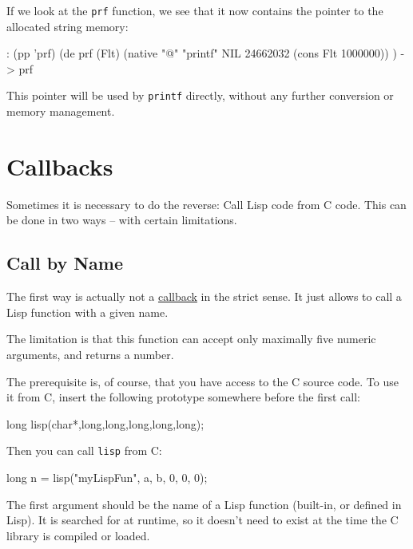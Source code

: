 If we look at the \texttt{prf} function, we see that it now contains the
pointer to the allocated string memory:

\begin{wideverbatim}
: (pp 'prf)
(de prf (Flt)
   (native "@" "printf" NIL 24662032 (cons Flt 1000000)) )
-> prf
\end{wideverbatim}

This pointer will be used by \texttt{printf} directly, without any
further conversion or memory management.


\section{Callbacks}
\label{sec:native-callbacks}

Sometimes it is necessary to do the reverse: Call Lisp code from C code.
This can be done in two ways -- with certain limitations.

\subsection{Call by Name}
\label{sec:native-callbacks}

The first way is actually not a
\href{http://en.wikipedia.org/wiki/Callback\_(computer\_programming)}{callback}
in the strict sense. It just allows to call a Lisp function with a given
name.

The limitation is that this function can accept only maximally five
numeric arguments, and returns a number.

The prerequisite is, of course, that you have access to the C source
code. To use it from C, insert the following prototype somewhere before
the first call:

\begin{wideverbatim}
long lisp(char*,long,long,long,long,long);
\end{wideverbatim}

Then you can call \texttt{lisp} from C:

\begin{wideverbatim}
long n = lisp("myLispFun", a, b, 0, 0, 0);
\end{wideverbatim}

The first argument should be the name of a Lisp function (built-in, or
defined in Lisp). It is searched for at runtime, so it doesn't need to
exist at the time the C library is compiled or loaded.

